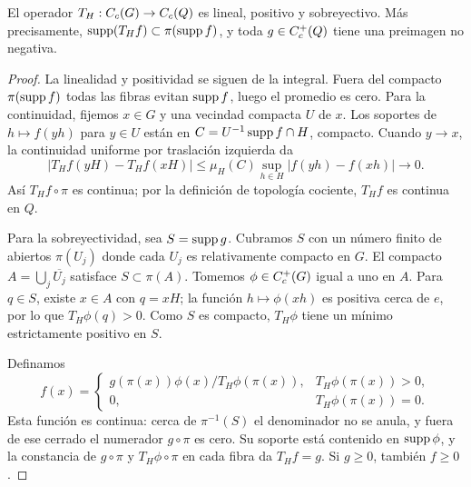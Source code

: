 \begin{lema}\label{v4:mod-promedio}
El operador $T_H:C_c(G)\to C_c(Q)$ es lineal, positivo y sobreyectivo. Más precisamente,
$\operatorname{supp}(T_Hf)\subset\pi(\operatorname{supp} f)$, y toda $g\in C_c^+(Q)$ tiene una preimagen no negativa.
\end{lema}
\begin{proof}
La linealidad y positividad se siguen de la integral. Fuera del compacto $\pi(\operatorname{supp} f)$ todas las fibras evitan $\operatorname{supp} f$, luego el promedio es cero. Para la continuidad, fijemos $x\in G$ y una vecindad compacta $U$ de $x$. Los soportes de $h\mapsto f(yh)$ para $y\in U$ están en
$C=U^{-1}\operatorname{supp} f\cap H$, compacto. Cuando $y\to x$, la continuidad uniforme por traslación izquierda da
\[
 |T_Hf(yH)-T_Hf(xH)|\leq
 \mu_H(C)\sup_{h\in H}|f(yh)-f(xh)|\longrightarrow0.
\]
Así $T_Hf\circ\pi$ es continua; por la definición de topología cociente, $T_Hf$ es continua en $Q$.

Para la sobreyectividad, sea $S=\operatorname{supp} g$. Cubramos $S$ con un número finito de abiertos $\pi(U_j)$ donde cada $U_j$ es relativamente compacto en $G$. El compacto $A=\bigcup_j\overline{U_j}$ satisface $S\subset\pi(A)$. Tomemos $\phi\in C_c^+(G)$ igual a uno en $A$. Para $q\in S$, existe $x\in A$ con $q=xH$; la función $h\mapsto\phi(xh)$ es positiva cerca de $e$, por lo que $T_H\phi(q)>0$. Como $S$ es compacto, $T_H\phi$ tiene un mínimo estrictamente positivo en $S$.

Definamos
\[
 f(x)=\begin{cases}
 g(\pi(x))\phi(x)/T_H\phi(\pi(x)),&T_H\phi(\pi(x))>0,\\
 0,&T_H\phi(\pi(x))=0.
 \end{cases}
\]
Esta función es continua: cerca de $\pi^{-1}(S)$ el denominador no se anula, y fuera de ese cerrado el numerador $g\circ\pi$ es cero. Su soporte está contenido en $\operatorname{supp}\phi$, y la constancia de $g\circ\pi$ y $T_H\phi\circ\pi$ en cada fibra da $T_Hf=g$. Si $g\geq0$, también $f\geq0$.
\end{proof}

